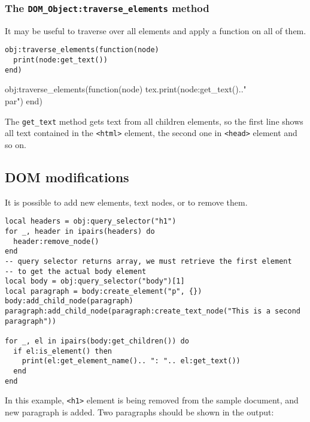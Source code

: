 \documentclass{ltxdoc}
\begin{document}
\subsubsection{The \texttt{DOM\_Object:traverse\_elements} method}

It may be useful to traverse over all elements and apply a function on all of them. 

\begin{verbatim}
obj:traverse_elements(function(node)
  print(node:get_text())
end)
\end{verbatim}

\begin{framed}
  \begin{luacode*}
obj:traverse_elements(function(node)
  tex.print(node:get_text().."\\par")
end)
  \end{luacode*}
\end{framed}

The \verb|get_text| method gets text from all children elements, so the first
line shows all text contained in the \verb|<html>| element, the second one in
\verb|<head>| element and so on.  

\subsection{DOM modifications}

It is possible to add new elements, text nodes, or to remove them. 

\begin{verbatim}
local headers = obj:query_selector("h1")
for _, header in ipairs(headers) do
  header:remove_node()
end
-- query selector returns array, we must retrieve the first element
-- to get the actual body element
local body = obj:query_selector("body")[1]
local paragraph = body:create_element("p", {})
body:add_child_node(paragraph)
paragraph:add_child_node(paragraph:create_text_node("This is a second paragraph"))

for _, el in ipairs(body:get_children()) do
  if el:is_element() then
    print(el:get_element_name().. ": ".. el:get_text())
  end
end
\end{verbatim}

In this example, \verb|<h1>| element is being removed from the sample document, and new 
paragraph is added. Two paragraphs should be shown in the output:
\end{document}

